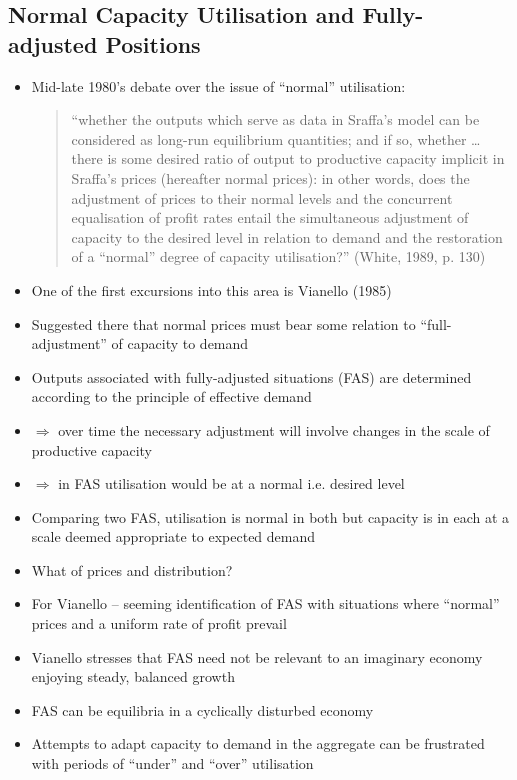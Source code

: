 \documentclass[a4paper,twoside]{article}
\numberwithin{equation}{section}
\numberwithin{figure}{section}
\begin{document}
\subsection{Normal Capacity Utilisation and Fully-adjusted Positions}
	\begin{itemize}
		\item Mid-late 1980's debate over the issue of ``normal'' utilisation:
		\begin{quote}
			``whether the outputs which serve as data in Sraffa's model can be considered as long-run equilibrium quantities; and if so, whether \dots\: there is some desired ratio of output to productive capacity implicit in Sraffa's prices (hereafter normal prices): in other words, does the adjustment of prices to their normal levels and the concurrent equalisation of profit rates entail the simultaneous adjustment of capacity to the desired level in relation to demand and the restoration of a ``normal'' degree of capacity utilisation?'' (White, 1989, p. 130)
		\end{quote}
		\item One of the first excursions into this area is Vianello (1985)
		\item Suggested there that normal prices must bear some relation to ``full-adjustment'' of capacity to demand
		\item Outputs associated with fully-adjusted situations (FAS) are determined according to the principle of effective demand
		\item \( \Rightarrow \) over time the necessary adjustment will involve changes in the scale of productive capacity
		\item \( \Rightarrow \)	in FAS utilisation would be at a normal i.e. desired level
		\item Comparing two FAS, utilisation is normal in both but capacity is in each at a scale deemed appropriate to expected demand
		\item What of prices and distribution?
		\item For Vianello -- seeming identification of FAS with situations where ``normal'' prices and a uniform rate of profit prevail
		\item Vianello stresses that FAS need not be relevant to an imaginary economy enjoying steady, balanced growth
		\item FAS can be equilibria in a cyclically disturbed economy
		\item Attempts to adapt capacity to demand in the aggregate can be frustrated with periods of ``under'' and ``over'' utilisation

\end{itemize}
\end{document}
